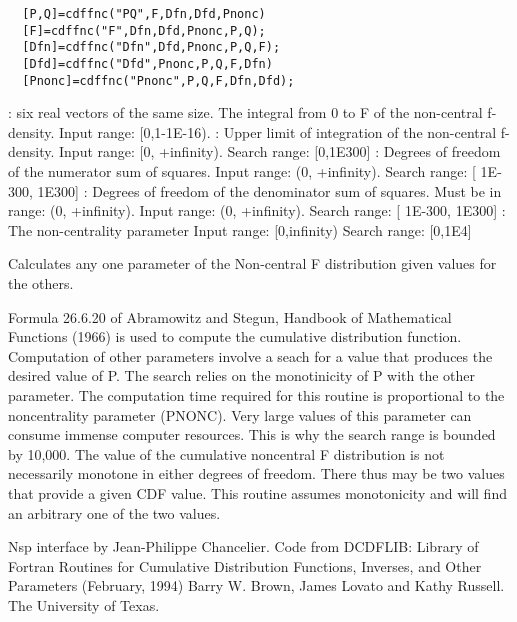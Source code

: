 \begin{mandesc}
\end{mandesc}
\label{cdffnc}
\begin{calling_sequence}
\begin{verbatim}
  [P,Q]=cdffnc("PQ",F,Dfn,Dfd,Pnonc)  
  [F]=cdffnc("F",Dfn,Dfd,Pnonc,P,Q);  
  [Dfn]=cdffnc("Dfn",Dfd,Pnonc,P,Q,F);  
  [Dfd]=cdffnc("Dfd",Pnonc,P,Q,F,Dfn)  
  [Pnonc]=cdffnc("Pnonc",P,Q,F,Dfn,Dfd);  
\end{verbatim}
\end{calling_sequence}
\begin{parameters}
  \begin{varlist}
     : six real vectors of the same size.
     The integral from 0 to F of the non-central f-density. Input range: [0,1-1E-16).
       : Upper limit of integration of the non-central f-density. Input range: [0, +infinity). Search range: [0,1E300]
         : Degrees of freedom of the numerator sum of squares. Input range: (0, +infinity). Search range: [ 1E-300, 1E300]
         : Degrees of freedom of the denominator sum of squares. Must be in range: (0, +infinity). Input range: (0, +infinity). Search range: [ 1E-300, 1E300]
         : The non-centrality parameter Input range: [0,infinity) Search range: [0,1E4]
  \end{varlist}
\end{parameters}
\begin{mandescription}
  Calculates any one parameter of the Non-central F distribution given values for the others.

  Formula  26.6.20   of   Abramowitz   and   Stegun,  Handbook  of
  Mathematical  Functions (1966) is used to compute the cumulative
  distribution function.
  Computation of other parameters involve a seach for a value that
  produces  the desired  value  of P.   The search relies  on  the
  monotinicity of P with the other parameter.
  The computation time  required for this  routine is proportional
  to the noncentrality  parameter  (PNONC).  Very large  values of
  this parameter can consume immense  computer resources.  This is
  why the search range is bounded by 10,000.
  The  value  of the  cumulative  noncentral F distribution is not
  necessarily monotone in either degrees  of freedom.  There  thus
  may be two values that provide a given  CDF value.  This routine
  assumes monotonicity  and will find  an arbitrary one of the two
  values.
\end{mandescription}

\begin{authors}
  Nsp interface by Jean-Philippe Chancelier. Code from DCDFLIB: 
  Library of Fortran Routines for Cumulative Distribution
  Functions, Inverses, and Other Parameters (February, 1994)
  Barry W. Brown, James Lovato and Kathy Russell. The University of Texas.
\end{authors}
